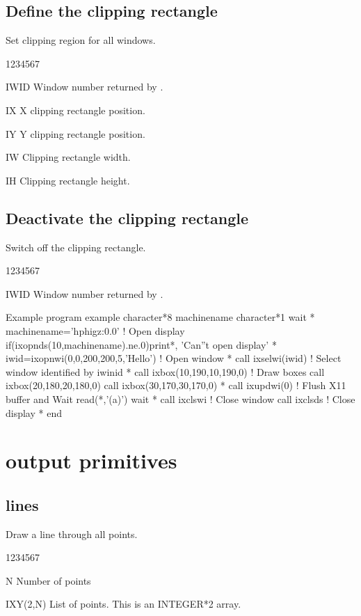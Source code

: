 \subsection{Define the  clipping rectangle}
\Action
Set clipping region for all windows.
\Pdesc
\begin{DLtt}{1234567}
\item[IWID] Window number returned by .
\item[IX] X clipping rectangle position.
\item[IY] Y clipping rectangle position.
\item[IW] Clipping rectangle width.
\item[IH] Clipping rectangle height.
\end{DLtt}
%
\subsection{Deactivate the  clipping rectangle}
\Action
Switch off the clipping rectangle.
\begin{DLtt}{1234567}
\item[IWID] Window number returned by .
\end{DLtt}
%
\begin{XMPt}{Example}
      program example
      character*8 machinename
      character*1 wait
*
      machinename='hphigz:0.0'               ! Open display
      if(ixopnds(10,machinename).ne.0)print*, 'Can''t open display'
*
      iwid=ixopnwi(0,0,200,200,5,'Hello')    !  Open window
*
      call ixselwi(iwid)                     ! Select window identified by iwinid
*
      call ixbox(10,190,10,190,0)            ! Draw boxes
      call ixbox(20,180,20,180,0)
      call ixbox(30,170,30,170,0)
*
      call ixupdwi(0)                        ! Flush X11 buffer and Wait
      read(*,'(a)') wait
*
      call ixclswi                           ! Close window
      call ixclsds                           ! Close display
*
      end
\end{XMPt}
%
%

\section{ output primitives}
\subsection{ lines}
\Action
Draw a line through all points.
\Pdesc
\begin{DLtt}{1234567}
\item[N] Number of points
\item[IXY(2,N)] List of points. This is an INTEGER*2 array.
\end{DLtt}
